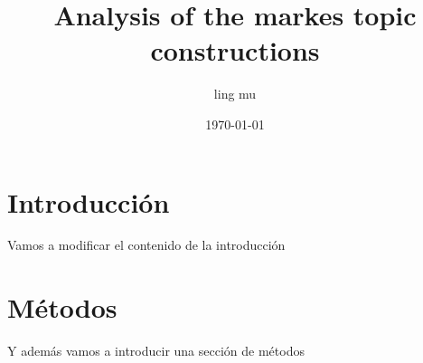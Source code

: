 \documentclass{article}
\title{Analysis of the markes topic constructions}
\author{ling mu}
\date{\today}
\begin{document}
\maketitle

\section{Introducción}

Vamos a modificar el contenido de la introducción

\section {Métodos}

Y además vamos a introducir una sección de métodos
\end{document}
